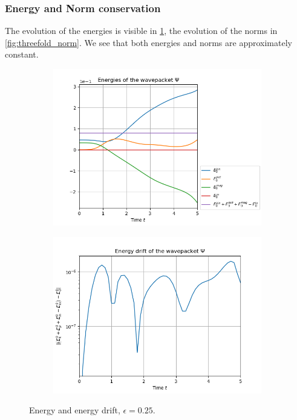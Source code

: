 \documentclass[11pt, a4paper, oneside]{article}
\begin{document}
\subsubsection{Energy and Norm conservation}
The evolution of the energies is visible in \cref{fig:threefold_energy}, the evolution of the norms in \cref{fig:threefold_norm}. We see that both energies and norms are approximately constant.
\begin{figure}[h]
  \begin{subfigure}[b]{0.45 \textwidth}
    \includegraphics[width = \textwidth]{graphics/threefold_morse/threefold_energies_block0.PNG}
  \end{subfigure}
  \hfill
  \begin{subfigure}[b]{0.45 \textwidth}
    \includegraphics[width = \textwidth]{graphics/threefold_morse/energy_drift_block0_log.PNG}
  \end{subfigure}
  \caption{Energy and energy drift, $\epsilon = 0.25$.}
  \label{fig:threefold_energy}
\end{figure}
\end{document}
